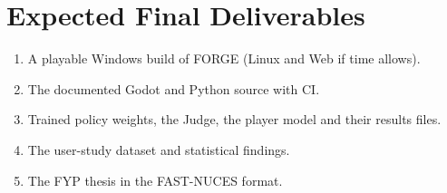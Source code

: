 \section{Expected Final Deliverables}
\begin{enumerate}
    \item A playable Windows build of FORGE (Linux and Web if time allows).
    \item The documented Godot and Python source with CI.
    \item Trained policy weights, the Judge, the player model and their results files.
    \item The user-study dataset and statistical findings.
    \item The FYP thesis in the FAST-NUCES format.
\end{enumerate}
